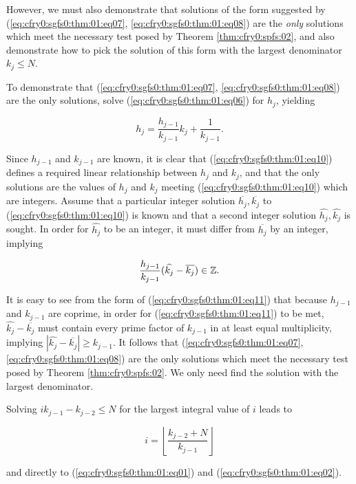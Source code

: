\begin{vworktheoremproof}
However, we must also demonstrate that solutions of the form
suggested by 
(\ref{eq:cfry0:sgfs0:thm:01:eq07}, \ref{eq:cfry0:sgfs0:thm:01:eq08})
are the \emph{only} solutions which meet
the necessary test posed by Theorem \ref{thm:cfry0:spfs:02}, and
also demonstrate how to pick the solution of this form
with the largest denominator $k_{j} \leq N$.

To demonstrate that 
(\ref{eq:cfry0:sgfs0:thm:01:eq07}, \ref{eq:cfry0:sgfs0:thm:01:eq08})
are the only solutions, solve (\ref{eq:cfry0:sgfs0:thm:01:eq06}) 
for $h_j$, yielding

\begin{equation}
\label{eq:cfry0:sgfs0:thm:01:eq10}
h_j = \frac{h_{j-1}}{k_{j-1}} k_j + \frac{1}{k_{j-1}} .
\end{equation}

Since $h_{j-1}$ and $k_{j-1}$ are known, it is clear that
(\ref{eq:cfry0:sgfs0:thm:01:eq10}) defines a required linear relationship 
between $h_j$ and $k_j$, and that the only solutions are the values of
$h_j$ and $k_j$ meeting 
(\ref{eq:cfry0:sgfs0:thm:01:eq10})
which are integers. Assume that a particular integer
solution $\overline{h_j}, \overline{k_j}$ to 
(\ref{eq:cfry0:sgfs0:thm:01:eq10}) is known
and that a second integer solution 
$\widehat{h_j}, \widehat{k_j}$ is sought.  In order for
$\widehat{h_j}$ to be an integer, it must
differ from $\overline{h_j}$ by an
integer, implying

\begin{equation}
\label{eq:cfry0:sgfs0:thm:01:eq11}
\frac{h_{j-1}}{k_{j-1}} ( \widehat{k_j} - \overline{k_j} ) \in {\mathbb{Z}}{} .
\end{equation}

It is easy to see from the form of (\ref{eq:cfry0:sgfs0:thm:01:eq11}) that 
because $h_{j-1}$ and $k_{j-1}$ are coprime, in order for 
(\ref{eq:cfry0:sgfs0:thm:01:eq11}) to be met, 
$\widehat{k_j} - \overline{k_j}$ 
must contain every prime factor of $k_{j-1}$ in at least
equal multiplicity, implying
$| \widehat{k_j} - \overline{k_j} | \geq k_{j-1}$.  It follows
that 
(\ref{eq:cfry0:sgfs0:thm:01:eq07}, \ref{eq:cfry0:sgfs0:thm:01:eq08})
are the only solutions 
which meet
the necessary test posed by Theorem \ref{thm:cfry0:spfs:02}.  We only
need find the solution with the largest denominator.

Solving $i k_{j-1} - k_{j-2} \leq N$ for the largest integral
value of $i$ leads to

\begin{equation}
\label{eq:cfry0:sgfs0:thm:01:eq12}
i = \left\lfloor {
\frac{k_{j-2} + N}{k_{j-1}}
} \right\rfloor
\end{equation}

and directly to (\ref{eq:cfry0:sgfs0:thm:01:eq01})
and (\ref{eq:cfry0:sgfs0:thm:01:eq02}).
\end{vworktheoremproof}
\vworktheoremfooter{}

